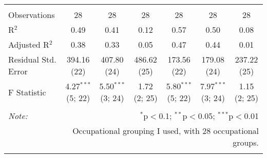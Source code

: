 \begin{sidewaystable}[!htbp]
\begin{tabular}{@{\extracolsep{0pt}}lcccccc}
  & & & & & & \\ 
\hline \\[-1.8ex] 
Observations & 28 & 28 & 28 & 28 & 28 & 28 \\ 
R$^{2}$ & 0.49 & 0.41 & 0.12 & 0.57 & 0.50 & 0.08 \\ 
Adjusted R$^{2}$ & 0.38 & 0.33 & 0.05 & 0.47 & 0.44 & 0.01 \\ 
Residual Std. Error & 394.16 (22) & 407.80 (24) & 486.62 (25) & 173.56 (22) & 179.08 (24) & 237.22 (25) \\ 
F Statistic & 4.27$^{***}$ (5; 22) & 5.50$^{***}$ (3; 24) & 1.72 (2; 25) & 5.80$^{***}$ (5; 22) & 7.97$^{***}$ (3; 24) & 1.15 (2; 25) \\ 
\hline 
\hline \\[-1.8ex] 
\textit{Note:}  & \multicolumn{6}{r}{$^{*}$p$<$0.1; $^{**}$p$<$0.05; $^{***}$p$<$0.01} \\ 
 & \multicolumn{6}{r}{Occupational grouping I used, with 28 occupational groups.} \\ 
\normalsize 
\end{tabular} 
\end{sidewaystable} 

